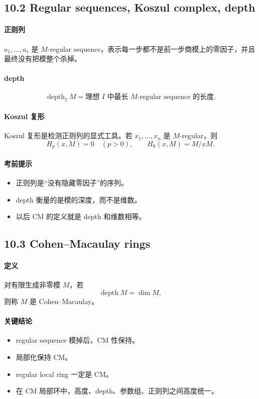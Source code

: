 \documentclass[a4paper]{ctexart}
\begin{document}
\subsection{10.2 Regular sequences, Koszul complex, depth}

\paragraph{正则列}
\(a_1,\dots,a_r\) 是 \(M\)-regular sequence，表示每一步都不是前一步商模上的零因子，并且最终没有把模整个杀掉。

\paragraph{depth}
\[
\operatorname{depth}_I M
=
\text{理想 } I \text{ 中最长 } M\text{-regular sequence 的长度}.
\]

\paragraph{Koszul 复形}
Koszul 复形是检测正则列的显式工具。若 \(x_1,\dots,x_n\) 是 \(M\)-regular，则
\[
H_p(x,M)=0\quad (p>0),\qquad H_0(x,M)=M/xM.
\]

\paragraph{考前提示}
\begin{itemize}
  \item 正则列是“没有隐藏零因子”的序列。
  \item depth 衡量的是模的深度，而不是维数。
  \item 以后 CM 的定义就是 depth 和维数相等。
\end{itemize}

\subsection{10.3 Cohen--Macaulay rings}

\paragraph{定义}
对有限生成非零模 \(M\)，若
\[
\operatorname{depth}M=\dim M,
\]
则称 \(M\) 是 Cohen--Macaulay。

\paragraph{关键结论}
\begin{itemize}
  \item regular sequence 模掉后，CM 性保持。
  \item 局部化保持 CM。
  \item regular local ring 一定是 CM。
  \item 在 CM 局部环中，高度、depth、参数组、正则列之间高度统一。
\end{itemize}
\end{document}

